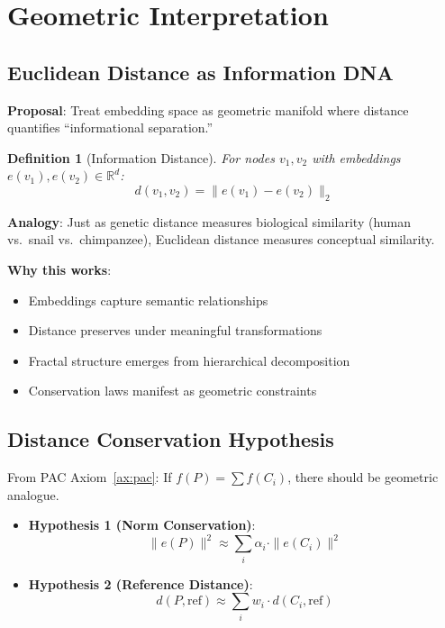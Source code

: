 \documentclass[11pt,a4paper]{article}
\newtheorem{definition}{Definition}
\newcommand{\R}{\mathbb{R}}
\newcommand{\Rtd}{\R^d}
\newcommand{\norm}[1]{\|#1\|}
\begin{document}
\section{Geometric Interpretation}

\subsection{Euclidean Distance as Information DNA}

\textbf{Proposal}: Treat embedding space as geometric manifold where distance quantifies ``informational separation.''

\begin{definition}[Information Distance]
For nodes $v_1, v_2$ with embeddings $e(v_1), e(v_2) \in \Rtd$:
\begin{equation}
d(v_1, v_2) = \norm{e(v_1) - e(v_2)}_2
\end{equation}
\end{definition}

\textbf{Analogy}: Just as genetic distance measures biological similarity (human vs.\ snail vs.\ chimpanzee), Euclidean distance measures conceptual similarity.

\textbf{Why this works}:
\begin{itemize}
    \item Embeddings capture semantic relationships
    \item Distance preserves under meaningful transformations
    \item Fractal structure emerges from hierarchical decomposition
    \item Conservation laws manifest as geometric constraints
\end{itemize}

\subsection{Distance Conservation Hypothesis}

From PAC Axiom~\ref{ax:pac}: If $f(P) = \sum f(C_i)$, there should be geometric analogue.

\begin{itemize}
    \item \textbf{Hypothesis 1 (Norm Conservation)}:
    \begin{equation}
    \norm{e(P)}^2 \approx \sum_i \alpha_i \cdot \norm{e(C_i)}^2
    \end{equation}
    
    \item \textbf{Hypothesis 2 (Reference Distance)}:
    \begin{equation}
    d(P, \text{ref}) \approx \sum_i w_i \cdot d(C_i, \text{ref})
    \end{equation}
\end{itemize}
\end{document}
